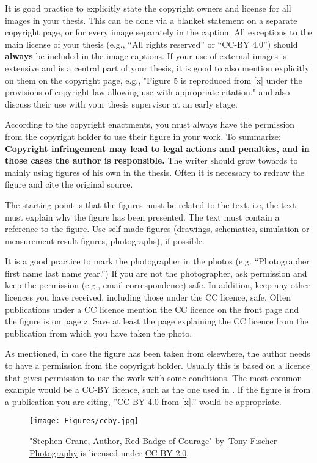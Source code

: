 It is good practice to explicitly state the copyright owners and
license for all images in your thesis. This can be done via a blanket
statement on a separate copyright page, or for every image separately
in the caption. All exceptions to the main license of your thesis
(e.g., ``All rights reserved'' or ``CC-BY 4.0'') should \textbf{always} be
included in the image captions. If your use of external images is extensive and is a central part of your thesis, it is good to also mention explicitly on 
them on the copyright page, e.g., "Figure 5 is reproduced from [x] under the provisions of copyright law allowing use with appropriate citation."
and also discuss their use with your thesis supervisor at an early stage.

According to the copyright enactments, you must always have the
permission from the copyright holder to use their figure in your
work. To summarize: \textbf{Copyright infringement may lead to legal
  actions and penalties, and in those cases the author is
  responsible.} The writer should grow towards to mainly using figures
of his own in the thesis. Often it is necessary to redraw the figure
and cite the original source.

The starting point is that the figures must be related to the text,
i.e, the text must explain why the figure has been presented. The text
must contain a reference to the figure. Use self-made figures
(drawings, schematics, simulation or measurement result figures,
photographs), if possible.

It is a good practice to mark the photographer in the photos
(e.g. “Photographer first name last name year.”) If you are not the
photographer, ask permission and keep the permission (e.g., email
correspondence) safe. In addition, keep any other licences you have
received, including those under the CC licence, safe. Often
publications under a CC licence mention the CC licence on the front
page and the figure is on page z. Save at least the page explaining
the CC licence from the publication from which you have taken the
photo.

As mentioned, in case the figure has been taken from elsewhere, the
author needs to have a permission from the copyright holder. Usually
this is based on a licence that gives permission to use the work with
some conditions. The most common example would be a CC-BY licence,
such as the one used in . If the figure is from a
publication you are citing, ”CC-BY 4.0 from [x].” would
 be appropriate.

\begin{figure}[H]
  \begin{center}
    \texttt{[image: Figures/ccby.jpg]}
  \end{center}
    \caption{"\href{https://openverse.org/image/110032f8-1a7a-421f-86b1-88fdfde2e44f }{Stephen Crane, Author, Red Badge of Courage}" by~\href{https://www.flickr.com/photos/tonythemisfit/}{Tony Fischer Photography} is licensed under \href{https://creativecommons.org/licenses/by/2.0/}{CC BY 2.0}.}
    \label{fig:ccbypic}
\end{figure}

